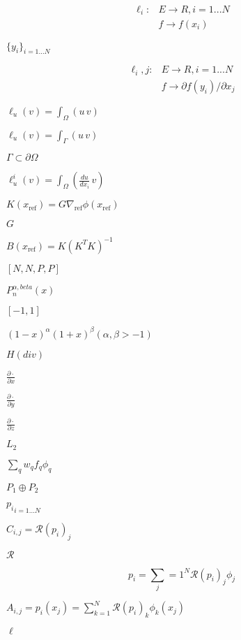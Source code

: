 \documentclass{article}
\begin{document}
\begin{eqnarray*} \ell_i :& E \longrightarrow R, i = 1...N\\ & f \longrightarrow f(x_i) \end{eqnarray*}
\pagebreak

$ \{y_i\}_{i=1...N} $
\pagebreak

\begin{eqnarray*} \ell_i,j :& E \longrightarrow R, i = 1...N\\ & f \longrightarrow \partial f(y_i)/ \partial x_j \end{eqnarray*}
\pagebreak

$\ell_u (v) = \int_\Omega( u\, v )$
\pagebreak

$\ell_u (v) = \int_{\Gamma} ( u\, v )$
\pagebreak

$\Gamma \subset \partial \Omega$
\pagebreak

$\ell_u^i (v) = \int_\Omega( \frac{d u}{d x_i} \, v )$
\pagebreak

$ K(x_{\mathrm{ref}}) = G \nabla_{\mathrm{ref}} \phi(x_{\mathrm{ref}}) $
\pagebreak

$G $
\pagebreak

$ B(x_{\mathrm{ref}}) = K ( K^T K )^{-1} $
\pagebreak

$[N,N,P,P]$
\pagebreak

$ P^{\alpha,beta}_n(x)$
\pagebreak

$[-1,1]$
\pagebreak

$(1-x)^\alpha(1+x)^\beta (\alpha,\beta > -1)$
\pagebreak

$ H(div)$
\pagebreak

$\frac{\partial \cdot}{\partial x}$
\pagebreak

$\frac{\partial \cdot}{\partial y}$
\pagebreak

$\frac{\partial \cdot}{\partial z}$
\pagebreak

$ L_2$
\pagebreak

$ \sum_q w_q f_q \phi_q $
\pagebreak

$ P_1 \oplus P_2$
\pagebreak

$ {p_i}_{i=1...N} $
\pagebreak

$ C_{i,j} = \mathcal{R}( p_i)_j $
\pagebreak

$\mathcal{R}$
\pagebreak

\[p_i = \sum_j=1^N \mathcal{R}( p_i )_j \phi_j\]
\pagebreak

$A_{i,j} = p_i(x_j) = \sum_{k=1}^N \mathcal{R}(p_i)_k \phi_k(x_j)$
\pagebreak

$\ell$
\pagebreak
\end{document}
